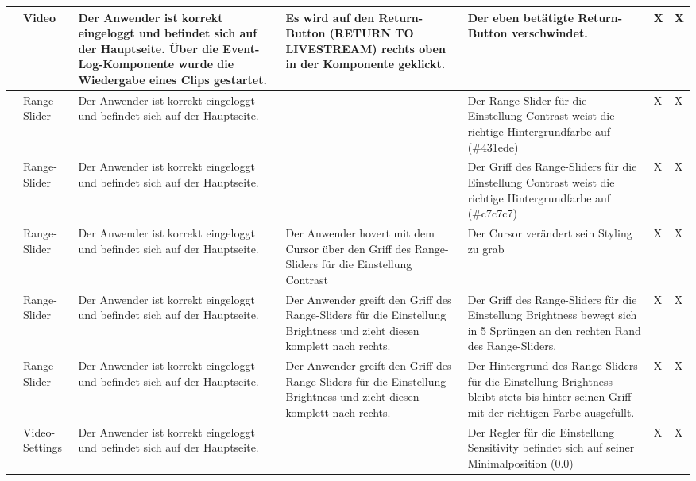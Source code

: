 \begin{longtable}{| p{} | p{} | p{} | p{} | p{} | p{} | p{} |}
	\stepcounter{TestNumber}\arabic{TestNumber} & Video & Der Anwender ist korrekt eingeloggt und befindet sich auf der Hauptseite. Über die Event-Log-Komponente wurde die Wiedergabe eines Clips gestartet. & Es wird auf den Return-Button (RETURN TO LIVESTREAM) rechts oben in der Komponente geklickt. & Der eben betätigte Return-Button verschwindet. & X & X \\ \hline
	
	\stepcounter{TestNumber}\arabic{TestNumber} & Range-Slider & Der Anwender ist korrekt eingeloggt und befindet sich auf der Hauptseite. & & Der Range-Slider für die Einstellung Contrast weist die richtige Hintergrundfarbe auf (\#431ede) & X & X \\ \hline

	\stepcounter{TestNumber}\arabic{TestNumber} & Range-Slider & Der Anwender ist korrekt eingeloggt und befindet sich auf der Hauptseite. & & Der Griff des Range-Sliders für die Einstellung Contrast weist die richtige Hintergrundfarbe auf (\#c7c7c7) & X & X \\ \hline
	
	\stepcounter{TestNumber}\arabic{TestNumber} & Range-Slider & Der Anwender ist korrekt eingeloggt und befindet sich auf der Hauptseite. & Der Anwender hovert mit dem Cursor über den Griff des Range-Sliders für die Einstellung Contrast & Der Cursor verändert sein Styling zu grab & X & X \\ \hline
	
	\stepcounter{TestNumber}\arabic{TestNumber} & Range-Slider & Der Anwender ist korrekt eingeloggt und befindet sich auf der Hauptseite. & Der Anwender greift den Griff des Range-Sliders für die Einstellung Brightness und zieht diesen komplett nach rechts. & Der Griff des Range-Sliders für die Einstellung Brightness bewegt sich in 5 Sprüngen an den rechten Rand des Range-Sliders. & X & X \\ \hline
	
	\stepcounter{TestNumber}\arabic{TestNumber} & Range-Slider & Der Anwender ist korrekt eingeloggt und befindet sich auf der Hauptseite. & Der Anwender greift den Griff des Range-Sliders für die Einstellung Brightness und zieht diesen komplett nach rechts. & Der Hintergrund des Range-Sliders für die Einstellung Brightness bleibt stets bis hinter seinen Griff mit der richtigen Farbe ausgefüllt. & X & X \\ \hline
	
	\stepcounter{TestNumber}\arabic{TestNumber} & Video-Settings & Der Anwender ist korrekt eingeloggt und befindet sich auf der Hauptseite. & & Der Regler für die Einstellung Sensitivity befindet sich auf seiner Minimalposition (0.0) & X & X \\ \hline
	

\end{longtable}
